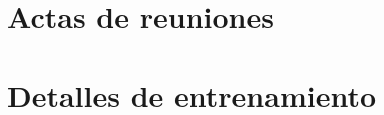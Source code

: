 \documentclass[a4page, 11pt, showtrims]{memoir}
\begin{document}
\chapter{Actas de reuniones}

\chapter{Detalles de entrenamiento}




\end{document}
